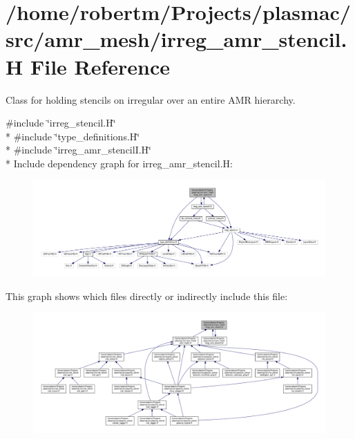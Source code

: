 \hypertarget{irreg__amr__stencil_8H}{}\section{/home/robertm/\+Projects/plasmac/src/amr\+\_\+mesh/irreg\+\_\+amr\+\_\+stencil.H File Reference}
\label{irreg__amr__stencil_8H}


Class for holding stencils on irregular over an entire A\+MR hierarchy.  


{\ttfamily \#include \char`\"{}irreg\+\_\+stencil.\+H\char`\"{}}\\*
{\ttfamily \#include \char`\"{}type\+\_\+definitions.\+H\char`\"{}}\\*
{\ttfamily \#include \char`\"{}irreg\+\_\+amr\+\_\+stencil\+I.\+H\char`\"{}}\\*
Include dependency graph for irreg\+\_\+amr\+\_\+stencil.\+H\+:\nopagebreak
\begin{figure}[H]
\begin{center}
\leavevmode
\includegraphics[width=350pt]{irreg__amr__stencil_8H__incl}
\end{center}
\end{figure}
This graph shows which files directly or indirectly include this file\+:\nopagebreak
\begin{figure}[H]
\begin{center}
\leavevmode
\includegraphics[width=350pt]{irreg__amr__stencil_8H__dep__incl}
\end{center}
\end{figure}
